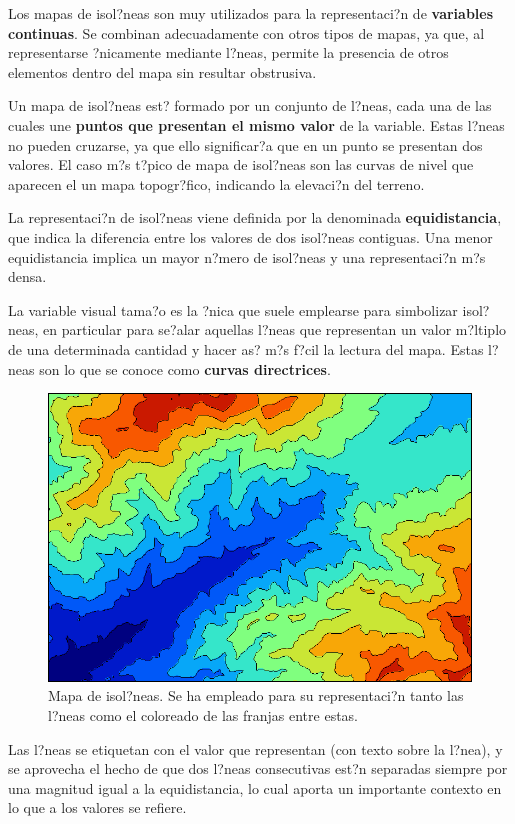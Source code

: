 Los mapas de isol?neas son muy utilizados para la representaci?n de \textbf{variables continuas}. Se combinan adecuadamente con otros tipos de mapas, ya que, al representarse ?nicamente mediante l?neas, permite la presencia de otros elementos dentro del mapa sin resultar obstrusiva.

Un mapa de isol?neas est? formado por un conjunto de l?neas, cada una de las cuales une \textbf{puntos que presentan el mismo valor} de la variable. Estas l?neas no pueden cruzarse, ya que ello significar?a que en un punto se presentan dos valores. El caso m?s t?pico de mapa de isol?neas son las curvas de nivel que aparecen el un mapa topogr?fico, indicando la elevaci?n del terreno.

La representaci?n de isol?neas viene definida por la denominada \textbf{equidistancia}, que indica la diferencia entre los valores de dos isol?neas contiguas. Una menor equidistancia implica un mayor n?mero de isol?neas y una representaci?n m?s densa.

La variable visual tama?o es la ?nica que suele emplearse para simbolizar isol?neas, en particular para se?alar aquellas l?neas que representan un valor m?ltiplo de una determinada cantidad y hacer as? m?s f?cil la lectura del mapa. Estas l?neas son lo que se conoce como \textbf{curvas directrices}. 

\begin{figure}[!hbt]
\centering
\includegraphics[width=.8\columnwidth]{../es/Visualizacion/Isolineas.png}
\caption{\small Mapa de isol?neas. Se ha empleado para su representaci?n tanto las l?neas como el coloreado de las franjas entre estas.}
\label{Fig:Isolineas} 
\end{figure}


Las l?neas se etiquetan con el valor que representan (con texto sobre la l?nea), y se aprovecha el hecho de que dos l?neas consecutivas est?n separadas siempre por una magnitud igual a la equidistancia, lo cual aporta un importante contexto en lo que a los valores se refiere. 

